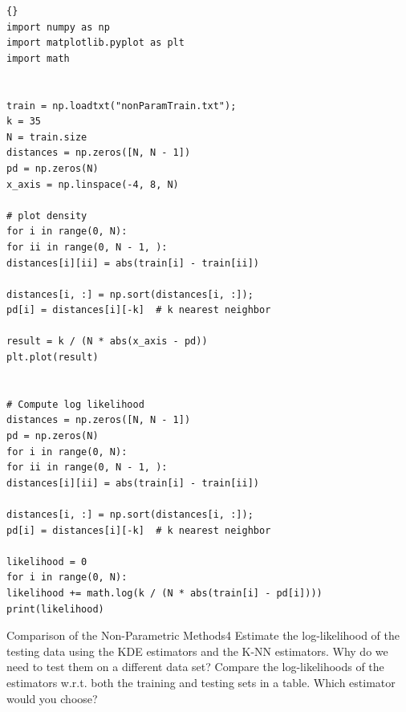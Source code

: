 \begin{questions}
\begin{lstlisting}{}
import numpy as np
import matplotlib.pyplot as plt
import math


train = np.loadtxt("nonParamTrain.txt");
k = 35
N = train.size
distances = np.zeros([N, N - 1])
pd = np.zeros(N)
x_axis = np.linspace(-4, 8, N)

# plot density
for i in range(0, N):
for ii in range(0, N - 1, ):
distances[i][ii] = abs(train[i] - train[ii])

distances[i, :] = np.sort(distances[i, :]);
pd[i] = distances[i][-k]  # k nearest neighbor

result = k / (N * abs(x_axis - pd))
plt.plot(result)


# Compute log likelihood
distances = np.zeros([N, N - 1])
pd = np.zeros(N)
for i in range(0, N):
for ii in range(0, N - 1, ):
distances[i][ii] = abs(train[i] - train[ii])

distances[i, :] = np.sort(distances[i, :]);
pd[i] = distances[i][-k]  # k nearest neighbor

likelihood = 0
for i in range(0, N):
likelihood += math.log(k / (N * abs(train[i] - pd[i])))
print(likelihood)
\end{lstlisting}


\begin{question}{Comparison of the Non-Parametric Methods}{4}
Estimate the log-likelihood of the testing data using the KDE estimators and the K-NN estimators.
Why do we need to test them on a different data set? Compare the log-likelihoods of the estimators w.r.t. both the training and testing sets in a table. Which estimator would you choose?

\begin{answer}\end{answer}

\end{question}

\end{questions}
